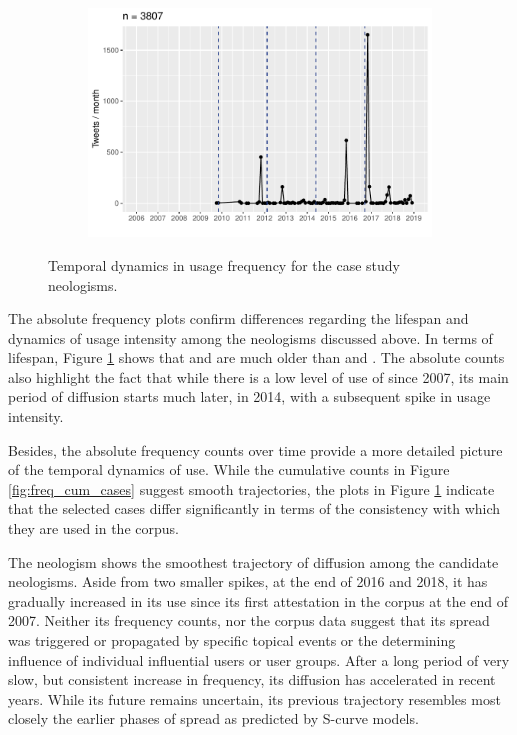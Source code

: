 \documentclass[
  a4paper,
  abstract=on,
  captions=tableabove
  ]{scrartcl}
\begin{document}
\begin{figure}
\begin{subfigure}{.3\linewidth}
          \includegraphics[width=\linewidth, height=.8\textheight, keepaspectratio]{"img/ui_poppygate_time.pdf"}
        \end{subfigure}
        \caption{Temporal dynamics in usage frequency for the case study neologisms.}
        \label{fig:freq-abs}
      \end{figure}

      The absolute frequency plots confirm differences regarding the lifespan and dynamics of usage intensity among the neologisms discussed above. In terms of lifespan, Figure \ref{fig:freq-abs} shows that  and  are much older than  and . The absolute counts also highlight the fact that while there is a low level of use of  since 2007, its main period of diffusion starts much later, in 2014, with a subsequent spike in usage intensity.


        Besides, the absolute frequency counts over time provide a more detailed picture of the temporal dynamics of use. While the cumulative counts in Figure \ref{fig:freq_cum_cases} suggest smooth trajectories, the plots in Figure \ref{fig:freq-abs} indicate that the selected cases differ significantly in terms of the consistency with which they are used in the corpus.

         The neologism  shows the smoothest trajectory of diffusion among the candidate neologisms. Aside from two smaller spikes, at the end of 2016 and 2018, it has gradually increased in its use since its first attestation in the corpus at the end of 2007. Neither its frequency counts, nor the corpus data suggest that its spread was triggered or propagated by specific topical events or the determining influence of individual influential users or user groups. After a long period of very slow, but consistent increase in frequency, its diffusion has accelerated in recent years. While its future remains uncertain, its previous trajectory resembles most closely the earlier phases of spread as predicted by S-curve models.
\end{document}
